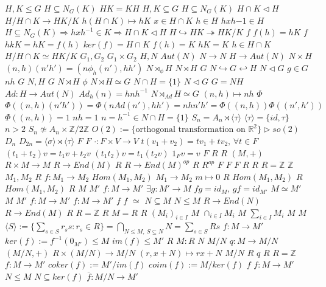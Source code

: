 \documentclass{article}
\begin{document}
$H,K \leq G$
$H \subseteq N_G(K)$
$HK=KH$
$H,K \subseteq G$
$H \subseteq N_G(K)$
$H \cap K \triangleleft H$
$H/H \cap K \rightarrow HK/K$
$h(H \cap K) \mapsto hK$
$x \in H \cap K$
$h \in H$
$hxh{-1} \in H$
$H \subseteq N_G(K) \Rightarrow hxh^{-1} \in K \Rightarrow H \cap K \triangleleft H$
$H \hookrightarrow HK \twoheadrightarrow HK/K$
$f$
$f(h)=hK$
$f$
$hkK=hK=f(h)$
$ker(f)=H \cap K$
$f(h)=K$
$hK=K$
$h \in H\cap K$
$H/H \cap K \simeq HK/K$
$G_1,G_2$
$G_1 \times G_2$
$H,N$
$Aut(N)$
$N \rightarrow N$
$H \rightarrow Aut(N)$
$N \times H$
$(n,h)(n'h')=(n \phi_h(n'),hh')$
$N \rtimes_\phi H$
$N \rtimes H$
$G$
$N \hookrightarrow G \hookleftarrow H$
$N \triangleleft G$
$g \in G$
$nh$
$G$
$N,H$
$G$
$N \rtimes H$
$\phi$
$N \rtimes H \simeq G$
$N \cap H =\{1\}$
$N \triangleleft G$
$G=NH$
$Ad:H \rightarrow Aut(N)$
$Ad_h(n)=hnh^{-1}$
$N \rtimes_{Ad} H \simeq G$
$(n,h) \mapsto nh$
$\Phi$
$\Phi((n,h)(n'h'))=\Phi(nAd(n'),hh')=nhn'h'=\Phi((n,h))\Phi((n',h'))$
$\Phi((n,h))=1$
$nh=1$
$n=h^{-1} \in N \cap H =\{1\}$
$S_n=A_n \rtimes \langle \tau \rangle$
$\langle \tau \rangle=\{id,\tau\}$
$n > 2$
$S_n \not\simeq A_n \times \mathbb{Z}/2\mathbb{Z}$
$O(2):=\{\text{orthogonal transformation on } \mathbb{R}^2\} \triangleright so(2)$
$D_n$
$D_{2n}=\langle \sigma \rangle \rtimes \langle \tau \rangle$
$F$
$F$
$\cdot:F \times V \rightarrow V$
$t(v_1+v_2)=tv_1+tv_2,\, \forall t \in F$
$(t_1+t_2)v=t_1v+t_2v$
$(t_1t_2)v=t_1(t_2v)$
$1_Fv=v$
$F$
$R$
$R$
$(M,+)$
$R \times M \rightarrow M$
$R \rightarrow End(M)$
$R$
$R \rightarrow End(M)^{op}$
$R$
$R^{op}$
$F$
$F$
$F$
$R$
$R$
$R=\mathbb{Z}$
$\mathbb{Z}$
$M_1,M_2$
$R$
$f:M_1 \rightarrow M_2$
$Hom(M_1,M_2)$
$M_1 \rightarrow M_2$
$m \mapsto 0$
$R$
$Hom(M_1,M_2)$
$R$
$Hom(M_1,M_2)$
$R$
$M$
$M'$
$f:M \rightarrow M'$
$\exists g:M' \rightarrow M$
$fg=id_M,\,gf=id_{M'}$
$M \simeq M'$
$M$
$M'$
$f: M \rightarrow M'$
$f:M \rightarrow M'$
$f$
$f$
$\simeq$
$N \subseteq M$
$N \leq M$
$R \rightarrow End(N)$
$R \rightarrow End(M)$
$R$
$R=\mathbb{Z}$
$R$
$M=R$
$R$
$(M_i)_{i \in I}$
$M$
$\cap_{i \in I}M_i$
$M$
$\sum_{i \in I} M_i$
$M$
$M$
$\langle S \rangle:=\{\sum_{s \in S} r_s s:r_s \in R\}=\bigcap_{N \leq M,\ S \subseteq N} N=\sum_{s \in S}Rs$
$f:M \rightarrow M'$
$ker(f):=f^{-1}(0_{M'}) \leq M$
$im(f) \leq M'$
$R$
$M:R$
$N$
$M/N$
$q:M \rightarrow M/N$
$(M/N,+)$
$R \times (M/N) \rightarrow M/N$
$(r,x+N) \mapsto rx+N$
$M/N$
$R$
$q$
$R$
$R=\mathbb{Z}$
$f:M \rightarrow M'$
$coker(f):=M'/im(f)$
$coim(f):=M/ker(f)$
$f$
$f:M \rightarrow M'$
$N \leq M$
$N \subseteq ker(f)$
$\bar{f}:M/N \rightarrow M'$
\end{document}
